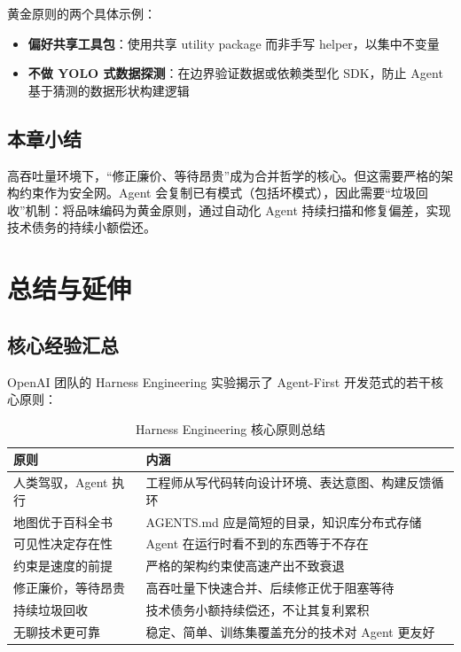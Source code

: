 \documentclass[a4paper]{article}
\begin{document}
黄金原则的两个具体示例：
\begin{itemize}[nosep]
  \item \textbf{偏好共享工具包}：使用共享 utility package 而非手写 helper，以集中不变量
  \item \textbf{不做 YOLO 式数据探测}：在边界验证数据或依赖类型化 SDK，防止 Agent 基于猜测的数据形状构建逻辑
\end{itemize}

\subsection{本章小结}

高吞吐量环境下，``修正廉价、等待昂贵''成为合并哲学的核心。但这需要严格的架构约束作为安全网。Agent 会复制已有模式（包括坏模式），因此需要``垃圾回收''机制：将品味编码为黄金原则，通过自动化 Agent 持续扫描和修复偏差，实现技术债务的持续小额偿还。

\newpage

\section{总结与延伸}

\subsection{核心经验汇总}

OpenAI 团队的 Harness Engineering 实验揭示了 Agent-First 开发范式的若干核心原则：

\begin{table}[H]
\centering
\small
\begin{tabular}{p{4cm}p{9cm}}
\toprule
\textbf{原则} & \textbf{内涵} \\
\midrule
人类驾驭，Agent 执行 & 工程师从写代码转向设计环境、表达意图、构建反馈循环 \\
地图优于百科全书 & AGENTS.md 应是简短的目录，知识库分布式存储 \\
可见性决定存在性 & Agent 在运行时看不到的东西等于不存在 \\
约束是速度的前提 & 严格的架构约束使高速产出不致衰退 \\
修正廉价，等待昂贵 & 高吞吐量下快速合并、后续修正优于阻塞等待 \\
持续垃圾回收 & 技术债务小额持续偿还，不让其复利累积 \\
无聊技术更可靠 & 稳定、简单、训练集覆盖充分的技术对 Agent 更友好 \\
\bottomrule
\end{tabular}
\caption{Harness Engineering 核心原则总结}
\end{table}
\end{document}

